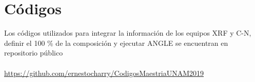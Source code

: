 \chapter{Códigos}\label{aped.A}
\lettrine{L}{}os códigos utilizados para integrar la información de los equipos XRF y C-N, definir el 100 \% de la composición y ejecutar ANGLE se encuentran en repositorio público 
\\ \\
\url{https://github.com/ernestocharry/CodigosMaestriaUNAM2019}